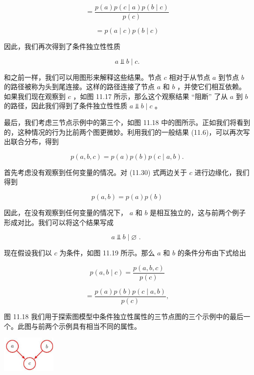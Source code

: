 \documentclass[10pt]{report}
\begin{document}
\[
= \frac{p\left( a\right) p\left( {c \mid  a}\right) p\left( {b \mid  c}\right) }{p\left( c\right) }
\]

\[
= p\left( {a \mid  c}\right) p\left( {b \mid  c}\right)
\]

因此，我们再次得到了条件独立性性质

\[
a ⫫ b \mid  c.
\]

和之前一样，我们可以用图形来解释这些结果。节点 \(c\) 相对于从节点 \(a\) 到节点 \(b\) 的路径被称为头到尾连接。这样的路径连接了节点 \(a\) 和 \(b\) ，并使它们相互依赖。如果我们现在观察到 \(c\) ，如图 11.17 所示，那么这个观察结果 “阻断” 了从 \(a\) 到 \(b\) 的路径，因此我们得到了条件独立性性质 \(a ⫫ b \mid  c\) 。

最后，我们考虑三节点示例中的第三个，如图 11.18 中的图所示。正如我们将看到的，这种情况的行为比前两个图更微妙。利用我们的一般结果 (11.6)，可以再次写出联合分布，得到

\[
p\left( {a,b,c}\right)  = p\left( a\right) p\left( b\right) p\left( {c \mid  a,b}\right) . \tag{11.30}
\]

首先考虑没有观察到任何变量的情况。对 (11.30) 式两边关于 \(c\) 进行边缘化，我们得到

\[
p\left( {a,b}\right)  = p\left( a\right) p\left( b\right)
\]

因此，在没有观察到任何变量的情况下， \(a\) 和 \(b\) 是相互独立的，这与前两个例子形成对比。我们可以将这个结果写成

\[
a ⫫ b \mid  \varnothing \text{ . } \tag{11.31}
\]

现在假设我们以 \(c\) 为条件，如图 11.19 所示。那么 \(a\) 和 \(b\) 的条件分布由下式给出

\[
p\left( {a,b \mid  c}\right)  = \frac{p\left( {a,b,c}\right) }{p\left( c\right) }
\]

\[
= \frac{p\left( a\right) p\left( b\right) p\left( {c \mid  a,b}\right) }{p\left( c\right) },
\]

图 11.18 我们用于探索图模型中条件独立性属性的三节点图的三个示例中的最后一个。此图与前两个示例具有相当不同的属性。

\begin{center}
\includegraphics[max width=0.2\textwidth]{images/0194e279-9b28-703a-88f4-c3ac21e2010d_359_1284_1837_264_177_0.jpg}
\end{center}
\hspace*{3em} 
\end{document}
